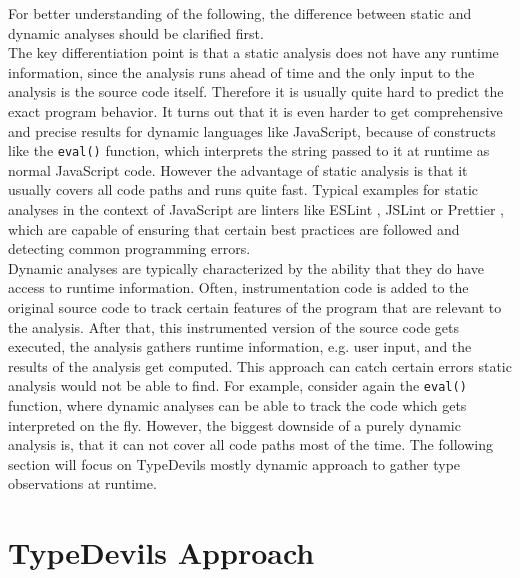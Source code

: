 \documentclass[runningheads,a4paper]{llncs}
\begin{document}
For better understanding of the following, the difference between static and dynamic analyses should be clarified first.\\
The key differentiation point is that a static analysis does not have any runtime information, since the analysis runs ahead of time and the only input to the analysis is the source code itself.
Therefore it is usually quite hard to predict the exact program behavior.
It turns out that it is even harder to get comprehensive and precise results for dynamic languages like JavaScript, because of constructs like the \lstinline[columns=fixed]{eval()} function, which interprets the string passed to it at runtime as normal JavaScript code. 
However the advantage of static analysis is that it usually covers all code paths and runs quite fast.
Typical examples for static analyses in the context of JavaScript are linters like ESLint \cite{ESLint}, JSLint \cite{JSLint} or Prettier \cite{Prettier}, which are capable of ensuring that certain best practices are followed and detecting common programming errors. \\
Dynamic analyses are typically characterized by the ability that they do have access to runtime information.
Often, instrumentation code is added to the original source code to track certain features of the program that are relevant to the analysis.
After that, this instrumented version of the source code gets executed, the analysis gathers runtime information, e.g. user input, and the results of the analysis get computed.
This approach can catch certain errors static analysis would not be able to find.
For example, consider again the \lstinline[columns=fixed]{eval()} function, where dynamic analyses can be able to track the code which gets interpreted on the fly.
However, the biggest downside of a purely dynamic analysis is, that it can not cover all code paths most of the time.
The following section will focus on TypeDevils mostly dynamic approach to gather type observations at runtime.

\section{TypeDevils Approach}
\end{document}
